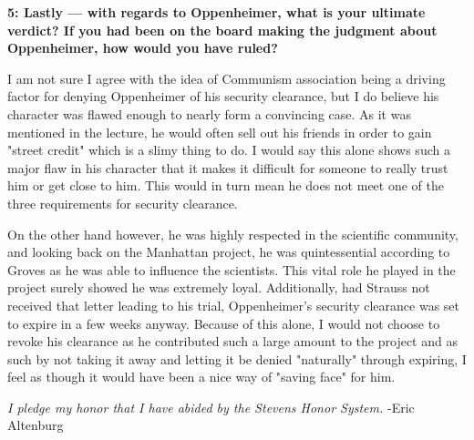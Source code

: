 \documentclass[12pt]{turabian-researchpaper}
\newcommand\question[2]{\noindent\textbf{#1: #2}}
\begin{document}
	\question{5}{Lastly — with regards to Oppenheimer, what is your ultimate verdict? If you had been on the board making the judgment about Oppenheimer, how would you have ruled?}

		I am not sure I agree with the idea of Communism association being a driving factor for denying Oppenheimer of his security clearance, but I do believe his character was flawed enough to nearly form a convincing case. As it was mentioned in the lecture, he would often sell out his friends in order to gain "street credit" which is a slimy thing to do. I would say this alone shows such a major flaw in his character that it makes it difficult for someone to really trust him or get close to him. This would in turn mean he does not meet one of the three requirements for security clearance.

		On the other hand however, he was highly respected in the scientific community, and looking back on the Manhattan project, he was quintessential according to Groves as he was able to influence the scientists. This vital role he played in the project surely showed he was extremely loyal. Additionally, had Strauss not received that letter leading to his trial, Oppenheimer's security clearance was set to expire in a few weeks anyway. Because of this alone, I would not choose to revoke his clearance as he contributed such a large amount to the project and as such by not taking it away and letting it be denied "naturally" through expiring, I feel as though it would have been a nice way of "saving face" for him.


\vspace*{\fill}
\noindent\textit{I pledge my honor that I have abided by the Stevens Honor System.} -Eric Altenburg
\end{document}
